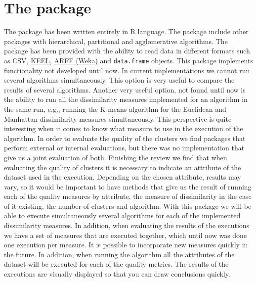 \section {The  package} \label{sec:seccion3}
The  package has been written entirely in R language. The package include other packages with hierarchical, partitional and agglomerative algorithms. The package has been provided with the ability to read data in different formats such as CSV, \href{https://sci2s.ugr.es/keel/references.php}{KEEL}, \href{https://www.cs.waikato.ac.nz/ml/weka/}{ARFF (Weka)} and \texttt{data.frame} objects. This package implements functionality not developed until now. In current implementations we cannot run several algorithms simultaneously. This option is very useful to compare the results of several algorithms. Another very useful option, not found until now is the ability to run all the dissimilarity measures implemented for an algorithm in the same run, e.g., running the K-means algorithm for the Euclidean and Manhattan dissimilarity measures simultaneously. This perspective is quite interesting when it comes to know what measure to use in the execution of the algorithm. In order to evaluate the quality of the clusters we find packages that perform external or internal evaluations, but there was no implementation that give us a joint evaluation of both. Finishing the review we find that when evaluating the quality of clusters it is necessary to indicate an attribute of the dataset used in the execution. Depending on the chosen attribute, results may vary, so it would be important to have methods that give us the result of running each of the quality measures by attribute, the measure of dissimilarity in the case of it existing, the number of clusters and algorithm. With this  package we will be able to execute simultaneously several algorithms for each of the implemented dissimilarity measures. In addition, when evaluating the results of the executions we have a set of measures that are executed together, which until now was done one execution per measure. It is possible to incorporate new measures quickly in the future. In addition, when running the algorithm all the attributes of the dataset will be executed for each of the quality metrics. The results of the executions are visually displayed so that you can draw conclusions quickly.


